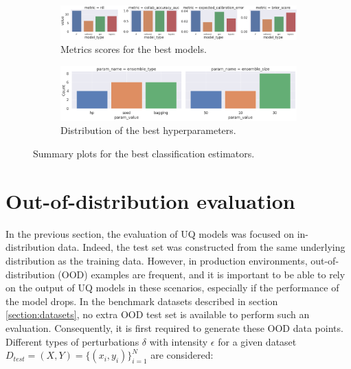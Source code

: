 \begin{figure}[!htbp]
    \centering
    \begin{subfigure}[b]{0.99\textwidth}
         \centering
         \includegraphics[width=\textwidth]{figures/eval/uqlearn/classification-best-models.png}
         \caption{Metrics scores for the best models.}
         \label{fig:classification-best-models-metrics}
     \end{subfigure}
     \hfill
     \begin{subfigure}[b]{0.99\textwidth}
         \centering
         \includegraphics[width=\linewidth]{figures/eval/uqlearn/classification-param-hist.png}
         \caption{Distribution of the best hyperparameters. }
         \label{fig:classification-hyperparam-hist}
     \end{subfigure}
     \caption{Summary plots for the best classification estimators.}
         \label{fig:classification-best-models}
\end{figure}




\section{Out-of-distribution evaluation} \label{experiment:OOD-evaluation}

In the previous section, the evaluation of UQ models was focused on in-distribution data. Indeed, the test set was constructed from the same underlying distribution as the training data. However, in production environments, out-of-distribution (OOD) examples are frequent, and it is important to be able to rely on the output of UQ models in these scenarios, especially if the performance of the model drops.
\newpage
In the benchmark datasets described in section \ref{section:datasets}, no extra OOD test set is available to perform such an evaluation. Consequently, it is first required to generate these OOD data points. Different types of perturbations $\delta$ with intensity $\epsilon$ for a given dataset $D_{test} = (X,Y) =\{(x_i,y_i)\}_{i=1}^N$ are considered:


